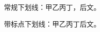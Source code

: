 \documentclass{exam-zh}
\begin{document}
\begin{minipage}{20em}
\noindent
常规下划线：甲乙丙丁\CJKunderline{\hspace*{9em}}，后文。

\noindent
带标点下划线：甲乙丙丁后文。
\end{minipage}
\end{document}
